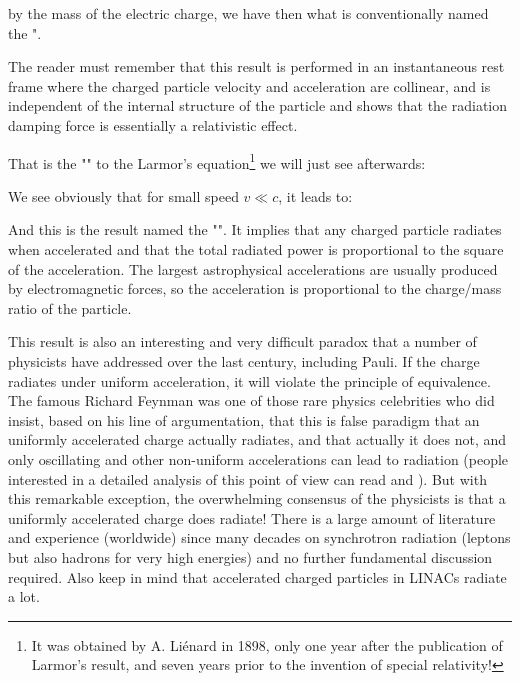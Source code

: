 	by the mass of the electric charge, we have then what is conventionally named the "\label{Abraham-Becker radiation damping force}.
	
	The reader must remember that this result is performed in an instantaneous rest frame where the charged particle velocity and acceleration are collinear, and is independent of the internal structure of the particle and shows that the radiation damping force is essentially a relativistic effect.
	
	That is the "\label{Liénard's generalization}" to the Larmor's equation\footnote{It was obtained by A. Liénard in 1898, only one year after the publication of Larmor’s result, and seven years prior to the invention of special relativity!} we will just see afterwards:
	
	We see obviously that for small speed $v\ll c$, it leads to:
	
	And this is the result named the "\label{Larmor equation}". It implies that any charged particle radiates when accelerated and that the total radiated power is proportional to the square of the acceleration. The largest astrophysical accelerations are usually produced by electromagnetic forces, so the acceleration is proportional to the charge/mass ratio of the particle. 
	
	This result is also an interesting and very difficult paradox that a number of physicists have addressed over the last century, including Pauli. If the charge radiates under uniform acceleration, it will violate the principle of equivalence. The famous Richard Feynman was one of those rare physics celebrities who did insist, based on his line of argumentation, that this is false paradigm that an uniformly accelerated charge actually radiates, and that actually it does not, and only oscillating and other non-uniform accelerations can lead to radiation (people interested in a detailed analysis of this point of view can read \cite{singal2018no} and \cite{singal2020discrepancy}). But with this remarkable exception, the overwhelming consensus of the physicists is that a uniformly accelerated charge does radiate! There is a large amount of literature and experience (worldwide) since many decades on synchrotron radiation (leptons but also hadrons for very high energies) and no further fundamental discussion required. Also keep in mind that accelerated charged particles in LINACs radiate a lot.
	

